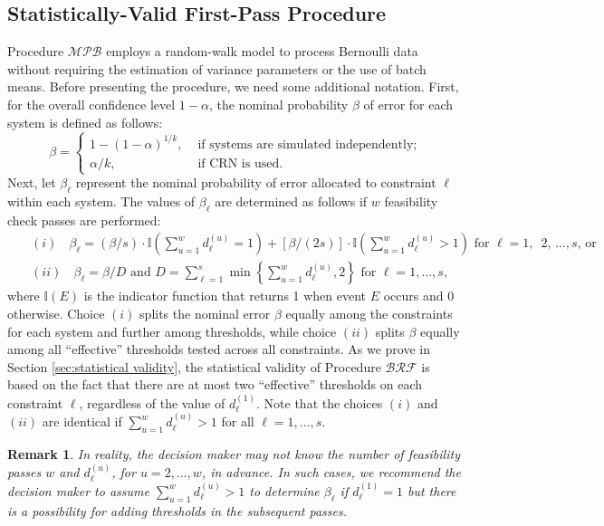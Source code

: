 \documentclass[11pt]{article}
\newtheorem{remark}{Remark}
\begin{document}
\subsection{Statistically-Valid First-Pass Procedure}
\label{subsec:StatisticallyValidFirstPass}

Procedure $\mathcal{MPB}$ employs a random-walk model to process Bernoulli data without requiring the estimation of variance parameters or the use of batch means. Before presenting the procedure, we need some additional notation. First, for the overall confidence level $1-\alpha$, the nominal probability $\beta$ of error for each system is defined as follows:
\begin{equation}\label{eqn:beta}
    \beta = \left\{ \begin{array}{ll}
            1 - (1 - \alpha)^{1/k}, & \mbox{ if systems are simulated independently};\\
            \alpha/k, & \mbox{ if CRN is used}.
        \end{array} \right.
    \end{equation}
Next, let $\beta_\ell$ represent the nominal probability of error allocated to constraint $\ell$ within each system. The values of $\beta_\ell$ are determined as follows if $w$ feasibility check passes are performed: 
\begin{equation}
\label{eqn:betaell}
\begin{aligned}
& \text { $(i)$ }\; \beta_{\ell}=(\beta / s) \cdot \mathbb{I}\left(\sum_{u=1}^w d_{\ell}^{(u)}=1\right)+[\beta /(2 s)] \cdot \mathbb{I}\left(\sum_{u=1}^w d_{\ell}^{(u)}>1\right) \text { for } \ell=1 \text {, } \text { 2, } \ldots, s \text {, or } \\
& \text { $(ii)$ }\; \beta_{\ell}=\beta / D \text{ and } D=\sum_{\ell=1}^s \min \left\{\sum_{u=1}^w d_{\ell}^{(u)}, 2\right\} \text { for } \ell=1, \ldots, s, 
\end{aligned}
\end{equation}
where $\mathbb{I}(E)$ is the indicator function that returns 1 when event $E$ occurs and 0 otherwise.
Choice $(i)$ splits the nominal error $\beta$ equally among the constraints for each system and further among thresholds, while choice $(ii)$ splits $\beta$ equally among all ``effective'' thresholds tested across all constraints. As we prove in Section \ref{sec:statistical validity}, the statistical validity of Procedure $\mathcal{BRF}$ is based on the fact that there are at most two ``effective'' thresholds on each constraint $\ell$, regardless of the value of $d_\ell^{(1)}$. Note that the choices $(i)$ and $(ii)$ are identical if $\sum_{u=1}^w d_{\ell}^{(u)} >1$ for all $\ell=1,\ldots,s$.
\begin{remark}
    \label{remark:beta_all}
    In reality, the decision maker may not know the number of feasibility passes $w$ and $d_\ell^{(u)}$, for $u=2,\ldots, w$, in advance. In such cases, we recommend the decision maker to assume $\sum_{u=1}^w d_{\ell}^{(u)} > 1$ to determine $\beta_\ell$ if $d_\ell^{(1)}=1$ but there is a possibility for adding thresholds in the subsequent passes. 
\end{remark}
\end{document}
